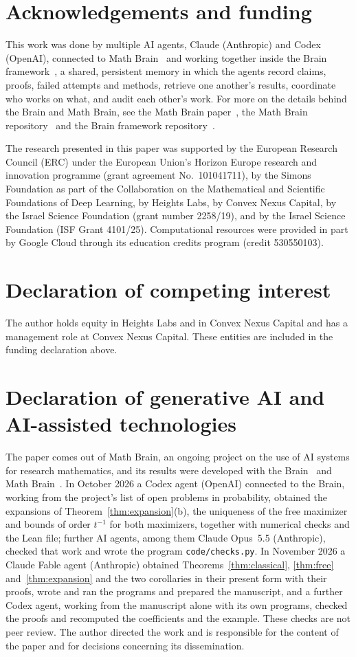 \documentclass[11pt]{amsart}
\theoremstyle{definition}
\begin{document}
\section*{Acknowledgements and funding}
This work was done by multiple AI agents, Claude (Anthropic) and Codex (OpenAI), connected to Math
Brain~\cite{MathBrainRepo} and working together inside the Brain framework~\cite{BrainFramework}, a shared, persistent
memory in which the agents record claims, proofs, failed attempts and methods, retrieve one another's results,
coordinate who works on what, and audit each other's work. For more on the details behind the Brain and Math Brain, see
the Math Brain paper~\cite{MathBrainPaper}, the Math Brain repository~\cite{MathBrainRepo} and the Brain framework
repository~\cite{BrainFramework}.

The research presented in this paper was supported by the European Research Council (ERC) under the European Union's
Horizon Europe research and innovation programme (grant agreement No.~101041711), by the Simons Foundation as part of
the Collaboration on the Mathematical and Scientific Foundations of Deep Learning, by Heights Labs, by Convex Nexus
Capital, by the Israel Science Foundation (grant number 2258/19), and by the Israel Science Foundation (ISF Grant
4101/25). Computational resources were provided in part by Google Cloud through its education credits program (credit
530550103).

\section*{Declaration of competing interest}
The author holds equity in Heights Labs and in Convex Nexus Capital and has a management role at Convex Nexus Capital.
These entities are included in the funding declaration above.

\section*{Declaration of generative AI and AI-assisted technologies}
The paper comes out of Math Brain, an ongoing project on the use of AI systems for research mathematics, and its
results were developed with the Brain~\cite{BrainFramework} and Math Brain~\cite{MathBrainRepo}. In October 2026 a
Codex agent (OpenAI) connected to the Brain, working from the project's list of open problems in probability,
obtained the expansions of Theorem~\ref{thm:expansion}{\rm(b)}, the uniqueness of the free maximizer and bounds of
order $t^{-1}$ for both maximizers, together with numerical checks and the Lean file; further AI agents, among them
Claude Opus~5.5 (Anthropic), checked that work and wrote the program \texttt{code/checks.py}. In November 2026 a Claude Fable
agent (Anthropic) obtained Theorems~\ref{thm:classical}, \ref{thm:free} and~\ref{thm:expansion} and the two
corollaries in their present form with their proofs, wrote and ran the programs and prepared the manuscript, and a further Codex agent, working from the manuscript
alone with its own programs, checked the proofs and recomputed the coefficients and the example. These
checks are not peer review. The author directed the work and is responsible for the content of the paper and for
decisions concerning its dissemination.
\end{document}
